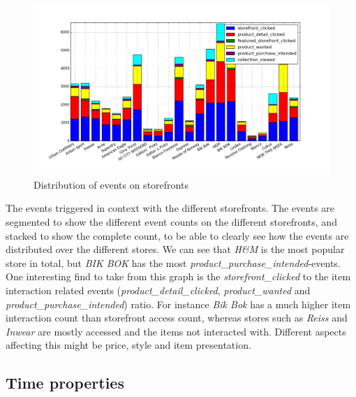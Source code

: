     \begin{figure}[H]
        \includegraphics[width=5in]{image/storefront_nameandEventdistribution.png}
        \centering
        \caption{Distribution of events on storefronts}
    \label{figure:eventOnStoreFrontDist}
    \end{figure}
        The events triggered in context with the different storefronts.
        The events are segmented to show the different event counts on the different storefronts, and stacked to show the complete count, to be able to clearly see how the events are distributed over the different stores.
        We can see that \emph{H\&M} is the most popular store in total, but \emph{BIK BOK} has the most \emph{product\_purchase\_intended}-events.
        One interesting find to take from this graph is the \emph{storefront\_clicked} to the item interaction related events (\emph{product\_detail\_clicked}, \emph{product\_wanted} and \emph{product\_purchase\_intended}) ratio.
        For instance \emph{Bik Bok} has a much higher item interaction count than storefront access count, whereas stores such as \emph{Reiss} and \emph{Inwear} are mostly accessed and the items not interacted with.
        Different aspects affecting this might be price, style and item presentation.

\subsection{Time properties}

